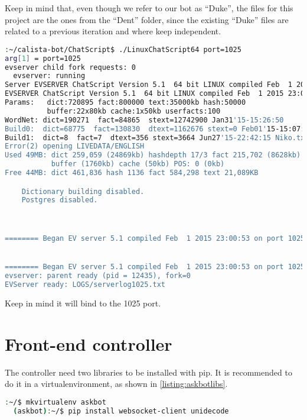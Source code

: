 Keep in mind that, even though we refer to our bot as ``Duke'', the files for this project are the ones from the ``Dent'' folder, since the existing ``Duke'' files are related to a previous iteration and where keep independent.

\begin{center} 
  \begin{lstlisting}[language=bash, captionpos=b, caption=ChatScript Server running, label=listing:csserver]
  :~/calista-bot/ChatScript$ ./LinuxChatScript64 port=1025
arg[1] = port=1025
evserver child fork requests: 0
  evserver: running
Server EVSERVER ChatScript Version 5.1  64 bit LINUX compiled Feb  1 2015 23:00:53
EVSERVER ChatScript Version 5.1  64 bit LINUX compiled Feb  1 2015 23:00:53
Params:   dict:720895 fact:800000 text:35000kb hash:50000 
          buffer:22x80kb cache:1x50kb userfacts:100
WordNet: dict=190271  fact=84865  stext=12742900 Jan31'15-15:26:50
Build0:  dict=68775  fact=130830  dtext=1162676 stext=0 Feb01'15-15:07:58 0.txt
Build1:  dict=8  fact=7  dtext=356 stext=3664 Jun27'15-22:42:15 Niko.txt
Error(2) opening LIVEDATA/ENGLISH
Used 49MB: dict 259,059 (24869kb) hashdepth 17/3 fact 215,702 (8628kb) text 13910kb
           buffer (1760kb) cache (50kb) POS: 0 (0kb)
Free 44MB: dict 461,836 hash 1136 fact 584,298 text 21,089KB 

    Dictionary building disabled.
    Postgres disabled.



======== Began EV server 5.1 compiled Feb  1 2015 23:00:53 on port 1025 at Tue Jun 30 23:41:37 2015 serverlog:1 userlog: 0


======== Began EV server 5.1 compiled Feb  1 2015 23:00:53 on port 1025 at Tue Jun 30 23:41:37 2015 serverlog:1 userlog: 0
evserver: parent ready (pid = 12435), fork=0
EVServer ready: LOGS/serverlog1025.txt

  \end{lstlisting}
\end{center}

Keep in mind it will bind to the 1025 port.

\section{Front-end controller}

The controller need two libraries to be installed with pip. It is recommended to do it in a virtualenvironment, as shown in \ref{listing:askbotlibs}.

\begin{center} 
  \begin{lstlisting}[language=bash, captionpos=b, caption=Libraries for the front end controller, label=listing:askbotlibs]
  :~/$ mkvirtualenv askbot
  (askbot):~/$ pip install websocket-client unidecode
  \end{lstlisting}
\end{center}


